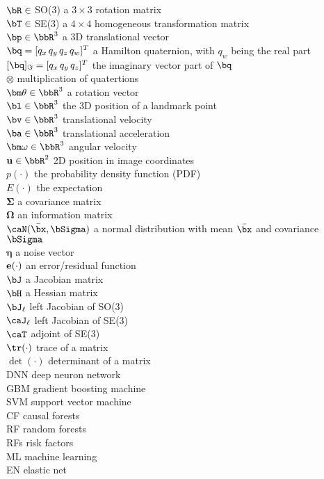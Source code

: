 \noindent
$\bR \in$ SO(3) \hfill a $3\times 3$ rotation matrix \\
$\bT \in$ SE(3) \hfill a $4 \times 4$ homogeneous transformation matrix\\
$\bp \in \bbR^3$ \hfill a 3D translational vector \\
$\bq=[q_x \, q_y \, q_z \, q_w ]^T$ \hfill a Hamilton quaternion, with $q_w$ being the real part \\
$[\bq]_\Im=[q_x\,q_y\,q_z]^T$ \hfill the imaginary vector part of $\bq$\\
$\otimes$ \hfill multiplication of quatertions \\
$\bm\theta \in \bbR^3$ \hfill a rotation vector \\
$\bl \in \bbR^3$ \hfill the 3D position of a landmark point \\
$\bv \in \bbR^3$ \hfill  translational velocity \\
$\ba \in \bbR^3$ \hfill  translational acceleration \\
$\bm\omega \in \bbR^3$ \hfill  angular velocity \\
${\bf u} \in \bbR^2$ \hfill 2D position in image coordinates \\
$p(\cdot)$ \hfill the probability density function (PDF) \\
$E(\cdot)$ \hfill  the expectation \\
$\bm\Sigma$ \hfill a covariance matrix \\
$\bm\Omega$ \hfill an information matrix \\
$\caN(\bar\bx,\bSigma)$ \hfill a normal distribution with mean $\bar\bx$ and covariance $\bSigma$ \\
${\bm\eta}$ \hfill a noise vector \\
${\bf e}(\cdot)$ \hfill an error/residual function \\
$\bJ$ \hfill a Jacobian matrix \\
$\bH$ \hfill a Hessian matrix \\
$\bJ_\ell$ \hfill left Jacobian of SO(3) \\
$\caJ_\ell$ \hfill left Jacobian of SE(3) \\
$\caT$ \hfill adjoint of SE(3)\\
$\tr(\cdot)$ \hfill trace of a matrix \\
$\det(\cdot)$ \hfill determinant of a matrix \\



\newpage
\noindent
DNN       \hfill deep neuron network                  \\
GBM       \hfill gradient boosting machine               \\
SVM       \hfill support vector machine               \\
CF        \hfill causal forests                    \\
RF        \hfill random forests                    \\
RFs       \hfill risk factors                      \\
ML        \hfill machine learning                \\
EN        \hfill elastic net                           \\

